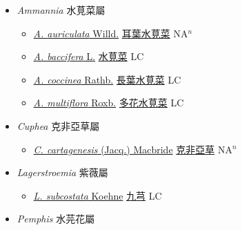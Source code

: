 
  \begin{itemize}
 \item[] \textit{Ammannia} 水莧菜屬
                    
  \begin{itemize}
        \item[] \href{http://www.theplantlist.org/tpl1.1/search?q=Ammannia+auriculata}{\textit{A. auriculata} Willd.}   \href{\detokenize{http://taibnet.sinica.edu.tw/chi/taibnet_species_list.php?T2=耳葉水莧菜&T2_new_value=true&fr=y}}{耳葉水莧菜} NA$^n$
        \item[] \href{http://www.theplantlist.org/tpl1.1/search?q=Ammannia+baccifera}{\textit{A. baccifera} L.}   \href{\detokenize{http://taibnet.sinica.edu.tw/chi/taibnet_species_list.php?T2=水莧菜&T2_new_value=true&fr=y}}{水莧菜} LC
        \item[] \href{http://www.theplantlist.org/tpl1.1/search?q=Ammannia+coccinea}{\textit{A. coccinea} Rathb.}   \href{\detokenize{http://taibnet.sinica.edu.tw/chi/taibnet_species_list.php?T2=長葉水莧菜&T2_new_value=true&fr=y}}{長葉水莧菜} LC
        \item[] \href{http://www.theplantlist.org/tpl1.1/search?q=Ammannia+multiflora}{\textit{A. multiflora} Roxb.}   \href{\detokenize{http://taibnet.sinica.edu.tw/chi/taibnet_species_list.php?T2=多花水莧菜&T2_new_value=true&fr=y}}{多花水莧菜} LC
  \end{itemize}
 \item[] \textit{Cuphea} 克非亞草屬
                    
  \begin{itemize}
        \item[] \href{http://www.theplantlist.org/tpl1.1/search?q=Cuphea+cartagenesis}{\textit{C. cartagenesis} (Jacq.) Macbride}   \href{\detokenize{http://taibnet.sinica.edu.tw/chi/taibnet_species_list.php?T2=克非亞草&T2_new_value=true&fr=y}}{克非亞草} NA$^n$
  \end{itemize}
 \item[] \textit{Lagerstroemia} 紫薇屬
                    
  \begin{itemize}
        \item[] \href{http://www.theplantlist.org/tpl1.1/search?q=Lagerstroemia+subcostata}{\textit{L. subcostata} Koehne}   \href{\detokenize{http://taibnet.sinica.edu.tw/chi/taibnet_species_list.php?T2=九芎&T2_new_value=true&fr=y}}{九芎} LC
  \end{itemize}
 \item[] \textit{Pemphis} 水芫花屬
                    

\end{itemize}
